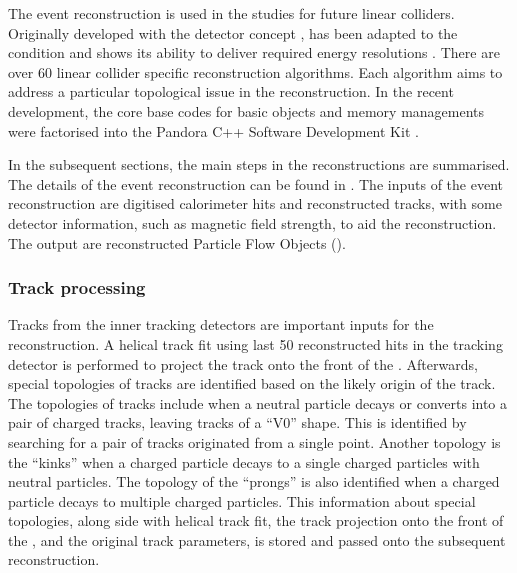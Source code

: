 The \pandora event reconstruction is used in the studies for future \ee linear colliders. Originally developed with the \ILD detector concept \cite{Thomson:2009rp}, \pandora has been adapted to the \CLIC condition and shows its ability to deliver required energy resolutions \cite{Linssen:2012hp,Marshall:2012ry}. There are over 60 \ee linear collider specific reconstruction algorithms. Each algorithm aims to address a particular topological issue in the reconstruction. In the recent development, the core base codes for basic objects and memory managements were factorised into the Pandora C++ Software Development Kit \cite{Marshall:2015rfa}.

In the subsequent sections, the main steps in the \pandora reconstructions are summarised. The details of the \pandora event reconstruction can be found in \cite{Thomson:2009rp,Marshall:2012ry,Marshall:2015rfa}.  The inputs of the \pandora event reconstruction are digitised calorimeter hits and reconstructed tracks, with some detector information, such as magnetic field strength, to aid the reconstruction. The output are reconstructed Particle Flow Objects (\PFOs).

\subsubsection{Track processing}
\label{sec:pandoraPandoraTrack}


Tracks from the inner tracking detectors are important inputs for the \pandora reconstruction.  A helical track fit using last 50 reconstructed hits in the tracking detector is performed to project the track onto the front of the \ECAL. Afterwards,  special topologies of tracks are identified based on the  likely origin of the track.  The topologies of tracks include when a neutral particle decays or converts into a pair of charged tracks, leaving tracks of a ``V0''  shape. This is identified by searching for a pair of tracks originated from a single point. Another topology is the ``kinks'' when a charged particle decays to a single charged particles with neutral particles. The   topology of  the ``prongs'' is also identified when a charged particle decays to multiple charged particles. This information about special topologies, along side with helical track fit, the track projection onto the front of the \ECAL, and the original track parameters, is stored and passed onto the subsequent reconstruction.

